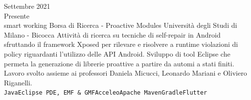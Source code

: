 \documentclass[9pt]{developercv}
\begin{document}
\vspace{0.5cm}




\begin{entrylist}
	\entry
	{Settembre 2021 \\ Presente	\\\footnotesize{smart working}}
	{Borsa di Ricerca - Proactive Modules}
	{Università degli Studi di Milano - Bicocca}
	{Attività di ricerca su tecniche di self-repair in Android sfruttando il framework Xposed per rilevare e risolvere a runtime violazioni di policy riguardanti l'utilizzo delle API Android. Sviluppo di tool Eclipse che permeta la generazione di librerie proattive a partire da automi a stati finiti. Lavoro svolto assieme ai professori Daniela Micucci, Leonardo Mariani e Oliviero Riganelli. \\ \texttt{Java}\slashsep\texttt{Eclipse PDE, EMF \& GMF}\slashsep\texttt{Acceleo}\slashsep\texttt{Apache Maven}\slashsep\texttt{Gradle}\slashsep\texttt{Flutter}}
	

\end{entrylist}
\end{document}
